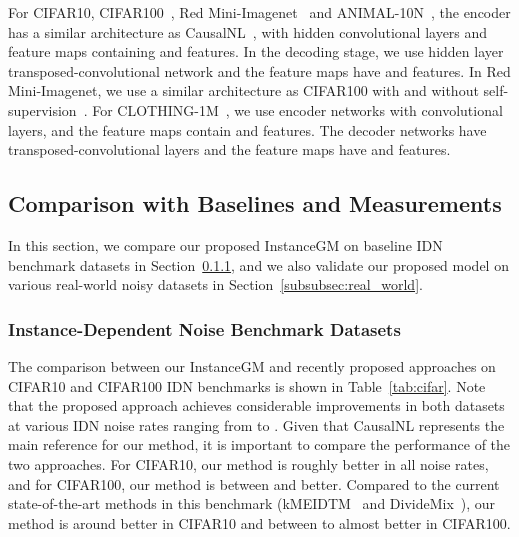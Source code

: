 \documentclass[10pt,twocolumn,letterpaper]{article}
\begin{document}
    For CIFAR10, CIFAR100~\cite{krizhevsky2009learning}, Red Mini-Imagenet~\cite{jiang2020beyond} and ANIMAL-10N~\cite{song2019selfie}, the encoder has a similar architecture as CausalNL~\cite{yao2021instance}, with  hidden convolutional layers and feature maps containing  and  features. In the decoding stage, we use  hidden layer transposed-convolutional network and the feature maps have  and  features. In Red Mini-Imagenet, we use a similar architecture as CIFAR100 with and without self-supervision~\cite{caron2021emerging}. 
    For CLOTHING-1M~\cite{xiao2015learning}, we use encoder networks with  convolutional layers, and the feature maps contain  and  features. The decoder networks have  transposed-convolutional layers and the feature maps have  and  features.
    
    \subsection{Comparison with Baselines and Measurements}\label{subsec:baseline}

    In this section, we compare our proposed InstanceGM on baseline IDN benchmark datasets in Section~\ref{subsubsec:benchmark}, and we also validate our proposed model on various real-world noisy datasets in Section~\ref{subsubsec:real_world}.
    
    \subsubsection{Instance-Dependent Noise Benchmark Datasets}\label{subsubsec:benchmark}
    
    The comparison between our InstanceGM and recently proposed approaches on CIFAR10 and CIFAR100 IDN benchmarks is shown in Table~\ref{tab:cifar}. 
    Note that the proposed approach achieves considerable improvements in both datasets at various IDN noise rates ranging from  to . 
    Given that CausalNL represents the main reference for our method, it is important to compare the performance of the two approaches.  For CIFAR10, our method is roughly  better in all noise rates, and for CIFAR100, our method is between  and  better.
    Compared to the current state-of-the-art methods in this benchmark (kMEIDTM~\cite{cheng2022instance} and DivideMix~\cite{li2020dividemix}), our method is around  better in CIFAR10 and between  to almost  better in CIFAR100.
    
\end{document}
